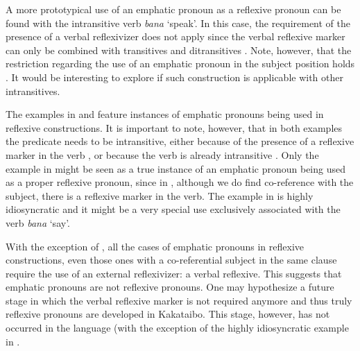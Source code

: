 \documentclass[output=paper,colorlinks,citecolor=brown,modfonts,nonflat]{langscibook}
\begin{document}
A more prototypical use of an emphatic pronoun as a reflexive pronoun can be found with the intransitive verb \textit{bana} ‘speak’. In this case, the requirement of the presence of a verbal reflexivizer does not apply since the verbal reflexive marker can only be combined with transitives and ditransitives . Note, however, that the restriction regarding the use of an emphatic pronoun in the subject position holds . It would be interesting to explore if such construction is applicable with other intransitives.

\ea%
    \label{ex:zariquiey:16}
    \z
\z

The examples in  and  feature instances of emphatic pronouns being used in reflexive constructions. It is important to note, however, that in both examples the predicate needs to be intransitive, either because of the presence of a reflexive marker in the verb , or because the verb is already intransitive . Only the example in  might be seen as a true instance of an emphatic pronoun being used as a proper reflexive pronoun, since in , although we do find co-reference with the subject, there is a reflexive marker in the verb. The example in  is highly idiosyncratic and it might be a very special use exclusively associated with the verb \textit{bana} ‘say’.

With the exception of , all the cases of emphatic pronouns in reflexive constructions, even those ones with a co-referential subject in the same clause require the use of an external reflexivizer: a verbal reflexive. This suggests that emphatic pronouns are not reflexive pronouns. One may hypothesize a future stage in which the verbal reflexive marker is not required anymore and thus truly reflexive pronouns are developed in Kakataibo. This stage, however, has not occurred in the language (with the exception of the highly idiosyncratic example in .
\end{document}

